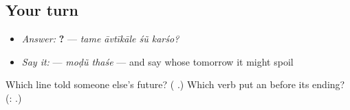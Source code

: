 \subsection*{Your turn}
\begin{itemize}
\raggedright
  \item \emph{Answer:} \textbf{   ?} — \emph{tame āvtīkāle śũ karśo?}
  \item \emph{Say it:} \textbf{ } — \emph{moḍũ thaśe} — and say whose tomorrow it might spoil
\end{itemize}

\begin{tcolorbox}[breakable,colback=teal!4,colframe=teal!35!black,title={Before you move on}]
Which line told someone else's future? (\textbf{   }.) Which verb put an \textbf{} before its ending? (\textbf{}: \textbf{}.)
\end{tcolorbox}

